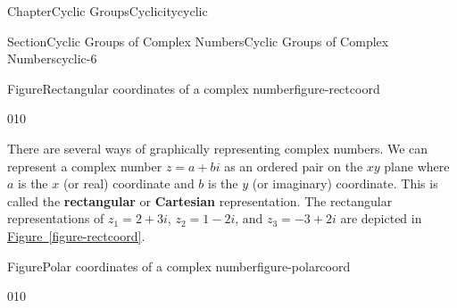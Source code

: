 \documentclass[oneside,10pt,]{book}
\newcommand{\xreffont}{\relax}
\newcommand{\terminology}[1]{\textbf{#1}}
\numberwithin{equation}{section}
\begin{document}
\begin{chapterptx}{Chapter}{Cyclic Groups}{}{Cyclicity}{}{}{cyclic}
\begin{sectionptx}{Section}{Cyclic Groups of Complex Numbers}{}{Cyclic Groups of Complex Numbers}{}{}{cyclic-6}
\begin{figureptx}{Figure}{Rectangular coordinates of a complex number}{figure-rectcoord}{}
\begin{image}{0}{1}{0}{}
{%
}%
\end{image}%
\tcblower
\end{figureptx}%
There are several ways of graphically representing complex numbers. We can represent a complex number \(z = a +bi\) as an ordered pair on the \(xy\) plane where \(a\) is the \(x\) (or real) coordinate and \(b\) is the \(y\) (or imaginary) coordinate. This is called the \terminology{rectangular} or \terminology{Cartesian} representation. The rectangular representations of \(z_1 = 2 + 3i\), \(z_2 = 1 - 2i\), and \(z_3 = - 3 + 2i\) are depicted in \hyperref[figure-rectcoord]{Figure~{\xreffont\ref{figure-rectcoord}}}.%
\begin{figureptx}{Figure}{Polar coordinates of a complex number}{figure-polarcoord}{}%
\begin{image}{0}{1}{0}{}%
\end{image}
\end{figureptx}
\end{sectionptx}
\end{chapterptx}
\end{document}
